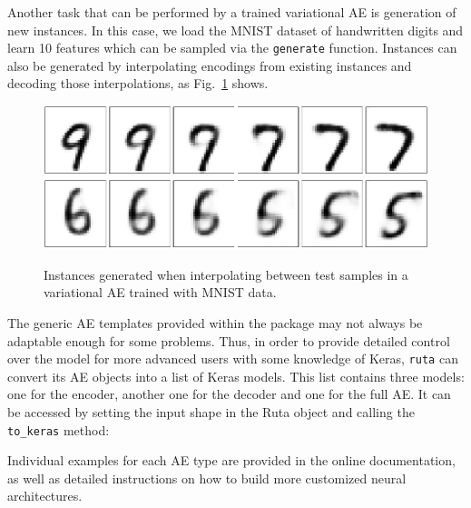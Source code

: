 

Another task that can be performed by a trained variational AE is generation of new instances. In this case, we load the MNIST dataset of handwritten digits and learn 10 features which can be sampled via the \texttt{generate} function. Instances can also be generated by interpolating encodings from existing instances and decoding those interpolations, as Fig.~\ref{p2fig.variational} shows.




\begin{figure}[ht]
  \centering
  \includegraphics[width=0.8\columnwidth]{variational_97.pdf}
  \includegraphics[width=0.8\columnwidth]{variational_65.pdf}
  \caption{Instances generated when interpolating between test samples in a variational AE trained with MNIST data.}
  \label{p2fig.variational}
\end{figure}

{The generic AE templates provided within the package may not always be adaptable enough for some problems. Thus, in order to provide detailed control over the model for more advanced users with some knowledge of Keras, \texttt{ruta} can convert its AE objects into a list of Keras models. This list contains three models: one for the encoder, another one for the decoder and one for the full AE. It can be accessed by setting the input shape in the Ruta object and calling the \texttt{to\_keras} method:}



Individual examples for each AE type are provided in the online documentation, as well as detailed instructions on how to build more customized neural architectures.

%



